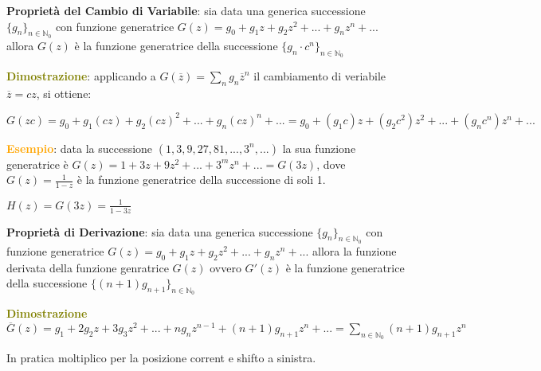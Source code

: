 \newpage
\begin{flushleft}
    \textbf{Proprietà del Cambio di Variabile}: sia data una generica successione $\{g_n\}_{n \in \mathbb{N}_0}$ con funzione generatrice $G(z) = g_0 + g_1z + g_2z^2 + ... + g_nz^n + ...$ allora $G(z)$ è la funzione generatrice della successione $\{g_n \cdot c^n\}_{n \in \mathbb{N}_0}$
    \begin{boxA}
        \textcolor{olive}{\textbf{Dimostrazione}}: applicando a $G(\overline{z}) = \sum_n g_n\overline{z}^n$ il cambiamento di veriabile $\overline{z} = cz$, si ottiene:

        {\centering
            $G(zc) = g_0 + g_1(cz) + g_2(cz)^2 + ... + g_n(cz)^n + ... = g_0 + (g_1c)z + (g_2c^2)z^2 + ... + (g_nc^n)z^n + ...$
        \par}
    \end{boxA}
    \begin{boxA}
        \textcolor{orange}{\textbf{Esempio}}: data la successione $(1, 3, 9, 27, 81, ..., 3^n, ...)$ la sua funzione generatrice è $G(z) = 1 + 3z + 9z^2 + ... + 3^mz^n + ... = G(3z)$, dove $G(z) = \frac{1}{1-z}$ è la funzione generatrice della successione di soli 1.

        {\centering
            $H(z) = G(3z) = \frac{1}{1-3z}$ 
        \par}
    \end{boxA}
\end{flushleft}
\begin{flushleft}
    \textbf{Proprietà di Derivazione}: sia data una generica successione $\{g_n\}_{n \in \mathbb{N}_0}$ con funzione generatrice $G(z) = g_0 + g_1z + g_2z^2 + ... + g_nz^n + ...$ allora la funzione derivata della funzione genratrice $G(z)$ ovvero $G'(z)$ è la funzione generatrice della successione $\{(n+1)g_{n+1}\}_{n \in \mathbb{N}_0}$

    \begin{boxA}
        \textcolor{olive}{\textbf{Dimostrazione}} \\
        $\overline{G}(z) = g_1 + 2g_2z + 3g_3z^2 + ... + ng_nz^{n-1} + (n+1)g_{n+1}z^n + ... = \underset{n \in \mathbb{N}_0}{\sum}(n+1)g_{n+1}z^n$
    \end{boxA}
    In pratica moltiplico per la posizione corrent e shifto a sinistra.
\end{flushleft}
